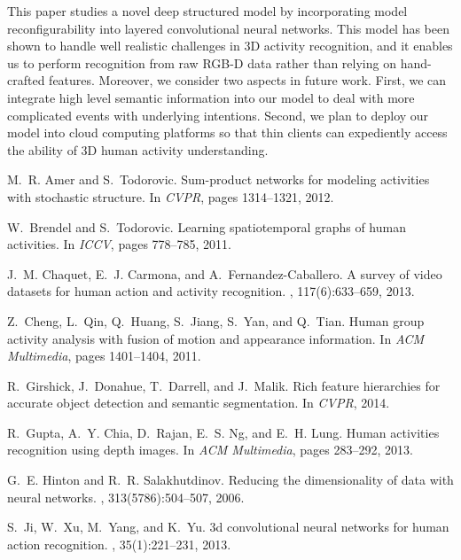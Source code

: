 \documentclass{sig-alternate}
\begin{document}
This paper studies a novel deep structured model by incorporating model reconfigurability into layered convolutional neural networks. This model has been shown to handle well realistic challenges in 3D activity recognition, and it enables us to perform recognition from raw RGB-D data rather than relying on hand-crafted features. Moreover, we consider two aspects in future work. First, we can integrate high level semantic information into our model to deal with more complicated events with underlying intentions. Second, we plan to deploy our model into cloud computing platforms so that thin clients can expediently access the ability of 3D human activity understanding.
\begin{thebibliography}{40}
\vspace{3pt}
M.~R. Amer and S.~Todorovic.
\newblock Sum-product networks for modeling activities with stochastic
  structure.
\newblock In {\em CVPR}, pages 1314--1321, 2012.

W.~Brendel and S.~Todorovic.
\newblock Learning spatiotemporal graphs of human activities.
\newblock In {\em ICCV}, pages 778--785, 2011.

J.~M. Chaquet, E.~J. Carmona, and A.~Fernandez-Caballero.
\newblock A survey of video datasets for human action and activity recognition.
, 117(6):633--659, 2013.

Z.~Cheng, L.~Qin, Q.~Huang, S.~Jiang, S.~Yan, and Q.~Tian.
\newblock Human group activity analysis with fusion of motion and appearance
  information.
\newblock In {\em ACM Multimedia}, pages 1401--1404, 2011.

R.~Girshick, J.~Donahue, T.~Darrell, and J.~Malik.
\newblock Rich feature hierarchies for accurate object detection and semantic
  segmentation.
\newblock In {\em CVPR}, 2014.

R.~Gupta, A.~Y. Chia, D.~Rajan, E.~S. Ng, and E.~H. Lung.
\newblock Human activities recognition using depth images.
\newblock In {\em ACM Multimedia}, pages 283--292, 2013.

G.~E. Hinton and R.~R. Salakhutdinov.
\newblock Reducing the dimensionality of data with neural networks.
, 313(5786):504--507, 2006.

S.~Ji, W.~Xu, M.~Yang, and K.~Yu.
\newblock 3d convolutional neural networks for human action recognition.
, 35(1):221--231, 2013.


\end{thebibliography}
\end{document}
